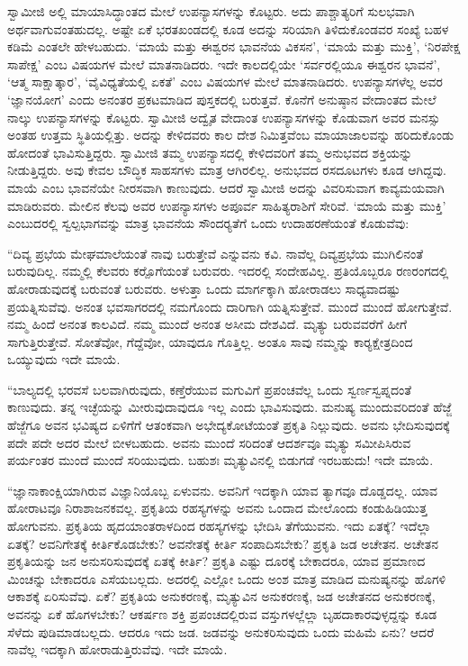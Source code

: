  ಸ್ವಾಮೀಜಿ ಅಲ್ಲಿ ಮಾಯಾಸಿದ್ಧಾಂತದ ಮೇಲೆ ಉಪನ್ಯಾಸಗಳನ್ನು ಕೊಟ್ಟರು. ಅದು ಪಾಶ್ಚಾತ್ಯರಿಗೆ ಸುಲಭವಾಗಿ ಅರ್ಥವಾಗುವಂತಹುದಲ್ಲ. ಅಷ್ಟೇ ಏಕೆ ಭರತಖಂಡದಲ್ಲಿ ಕೂಡ ಅದನ್ನು ಸರಿಯಾಗಿ ತಿಳಿದುಕೊಂಡವರ ಸಂಖ್ಯೆ ಬಹಳ ಕಡಿಮೆ ಎಂತಲೇ ಹೇಳಬಹುದು. ‘ಮಾಯೆ ಮತ್ತು ಈಶ್ವರನ ಭಾವನೆಯ ವಿಕಸನ’, ‘ಮಾಯೆ ಮತ್ತು ಮುಕ್ತಿ’, ‘ನಿರಪೇಕ್ಷ ಸಾಪೇಕ್ಷ’ ಎಂಬ ವಿಷಯಗಳ ಮೇಲೆ ಮಾತನಾಡಿದರು. ಇದೇ ಕಾಲದಲ್ಲಿಯೇ ‘ಸರ್ವರಲ್ಲಿಯೂ ಈಶ್ವರನ ಭಾವನೆ’, ‘ಆತ್ಮ ಸಾಕ್ಷಾತ್ಕಾರ’, ‘ವೈವಿಧ್ಯತೆಯಲ್ಲಿ ಏಕತೆ’ ಎಂಬ ವಿಷಯಗಳ ಮೇಲೆ ಮಾತನಾಡಿದರು. ಉಪನ್ಯಾಸಗಳೆಲ್ಲ ಅವರ ‘ಜ್ಞಾನಯೋಗ’ ಎಂದು ಅನಂತರ ಪ್ರಕಟಮಾಡಿದ ಪುಸ್ತಕದಲ್ಲಿ ಬರುತ್ತವೆ. ಕೊನೆಗೆ ಅನುಷ್ಠಾನ ವೇದಾಂತದ ಮೇಲೆ ನಾಲ್ಕು ಉಪನ್ಯಾಸಗಳನ್ನು ಕೊಟ್ಟರು. ಸ್ವಾಮೀಜಿ ಅದ್ವೈತ ವೇದಾಂತ ಉಪನ್ಯಾಸಗಳನ್ನು ಕೊಡುವಾಗ ಅವರ ಮನಸ್ಸು ಅಂತಹ ಉತ್ತಮ ಸ್ಥಿತಿಯಲ್ಲಿತ್ತು. ಅದನ್ನು ಕೇಳಿದವರು ಕಾಲ ದೇಶ ನಿಮಿತ್ತವೆಂಬ ಮಾಯಾಜಾಲವನ್ನು ಹರಿದುಕೊಂಡು ಹೋದಂತೆ ಭಾವಿಸುತ್ತಿದ್ದರು. ಸ್ವಾಮೀಜಿ ತಮ್ಮ ಉಪನ್ಯಾಸದಲ್ಲಿ ಕೇಳಿದವರಿಗೆ ತಮ್ಮ ಅನುಭವದ ಶಕ್ತಿಯನ್ನು ನೀಡುತ್ತಿದ್ದರು. ಅವು ಕೇವಲ ಬೌದ್ಧಿಕ ಸಾಹಸಗಳು ಮಾತ್ರ ಆಗಿರಲಿಲ್ಲ. ಅನುಭವದ ರಸದೂಟಗಳು ಕೂಡ ಆಗಿದ್ದವು. ಮಾಯೆ ಎಂಬ ಭಾವನೆಯೇ ನೀರಸವಾಗಿ ಕಾಣುವುದು. ಆದರೆ ಸ್ವಾಮೀಜಿ ಅದನ್ನು ವಿವರಿಸುವಾಗ ಕಾವ್ಯಮಯವಾಗಿ ಮಾಡಿರುವರು. ಮೇಲಿನ ಕೆಲವು ಅವರ ಉಪನ್ಯಾಸಗಳು ಅಪೂರ್ವ ಸಾಹಿತ್ಯರಾಶಿಗೆ ಸೇರಿವೆ. ‘ಮಾಯೆ ಮತ್ತು ಮುಕ್ತಿ’ ಎಂಬುದರಲ್ಲಿ ಸ್ವಲ್ಪಭಾಗವನ್ನು ಮಾತ್ರ ಭಾವನೆಯ ಸೌಂದರ‍್ಯತೆಗೆ ಒಂದು ಉದಾಹರಣೆಯಂತೆ ಕೊಡುವೆವು: 

 “ದಿವ್ಯ ಪ್ರಭೆಯ ಮೇಘಮಾಲೆಯಂತೆ ನಾವು ಬರುತ್ತೇವೆ ಎನ್ನುವನು ಕವಿ. ನಾವೆಲ್ಲ ದಿವ್ಯಪ್ರಭೆಯ ಮುಗಿಲಿನಂತೆ ಬರುವುದಿಲ್ಲ. ನಮ್ಮಲ್ಲಿ ಕೆಲವರು ಕರ‍್ಪೊಗೆಯಂತೆ ಬರುವರು. ಇದರಲ್ಲಿ ಸಂದೇಹವಿಲ್ಲ. ಪ್ರತಿಯೊಬ್ಬರೂ ರಣರಂಗದಲ್ಲಿ ಹೋರಾಡುವುದಕ್ಕೆ ಬರುವಂತೆ ಬರುವರು. ಅಳುತ್ತಾ ಒಂದು ಮಾರ್ಗಕ್ಕಾಗಿ ಹೋರಾಡಲು ಸಾಧ್ಯವಾದಷ್ಟು ಪ್ರಯತ್ನಿಸುವೆವು. ಅನಂತ ಭವಸಾಗರದಲ್ಲಿ ನಮಗೊಂದು ದಾರಿಗಾಗಿ ಯತ್ನಿಸುತ್ತೇವೆ. ಮುಂದೆ ಮುಂದೆ ಹೋಗುತ್ತೇವೆ. ನಮ್ಮ ಹಿಂದೆ ಅನಂತ ಕಾಲವಿದೆ. ನಮ್ಮ ಮುಂದೆ ಅನಂತ ಅಸೀಮ ದೇಶವಿದೆ. ಮೃತ್ಯು ಬರುವವರೆಗೆ ಹೀಗೆ ಸಾಗುತ್ತಿರುತ್ತೇವೆ. ಸೋತೆವೋ, ಗೆದ್ದೆವೋ, ಯಾವುದೂ ಗೊತ್ತಿಲ್ಲ. ಅಂತೂ ಸಾವು ನಮ್ಮನ್ನು ಕಾರ‍್ಯಕ್ಷೇತ್ರದಿಂದ ಒಯ್ಯುವುದು ಇದೇ ಮಾಯೆ. 

 “ಬಾಲ್ಯದಲ್ಲಿ ಭರವಸೆ ಬಲವಾಗಿರುವುದು, ಕಣ್ತೆರೆಯುವ ಮಗುವಿಗೆ ಪ್ರಪಂಚವೆಲ್ಲ ಒಂದು ಸ್ವರ್ಣಸ್ವಪ್ನದಂತೆ ಕಾಣುವುದು. ತನ್ನ ಇಚ್ಛೆಯನ್ನು ಮೀರುವುದಾವುದೂ ಇಲ್ಲ ಎಂದು ಭಾವಿಸುವುದು. ಮನುಷ್ಯ ಮುಂದುವರಿದಂತೆ ಹೆಜ್ಜೆ ಹೆಜ್ಜೆಗೂ ಅವನ ಭವಿಷ್ಯದ ಏಳಿಗೆಗೆ ಆತಂಕವಾಗಿ ಅಭೇದ್ಯಕೋಟೆಯಂತೆ ಪ್ರಕೃತಿ ನಿಲ್ಲುವುದು. ಅವನು ಭೇದಿಸುವುದಕ್ಕೆ ಪದೇ ಪದೇ ಅದರ ಮೇಲೆ ಬೀಳಬಹುದು. ಅವನು ಮುಂದೆ ಸರಿದಂತೆ ಆದರ್ಶವೂ ಮೃತ್ಯು ಸಮೀಪಿಸಿರುವ ಪರ್ಯಂತರ ಮುಂದೆ ಮುಂದೆ ಸರಿಯುವುದು. ಬಹುಶಃ ಮೃತ್ಯುವಿನಲ್ಲಿ ಬಿಡುಗಡೆ ಇರಬಹುದು! ಇದೇ ಮಾಯೆ. 

 “ಜ್ಞಾನಾಕಾಂಕ್ಷಿಯಾಗಿರುವ ವಿಜ್ಞಾನಿಯೊಬ್ಬ ಏಳುವನು. ಅವನಿಗೆ ಇದಕ್ಕಾಗಿ ಯಾವ ತ್ಯಾಗವೂ ದೊಡ್ಡದಲ್ಲ. ಯಾವ ಹೋರಾಟವೂ ನಿರಾಶಾಜನಕವಲ್ಲ. ಪ್ರಕೃತಿಯ ರಹಸ್ಯಗಳನ್ನು ಅವನು ಒಂದಾದ ಮೇಲೊಂದು ಕಂಡುಹಿಡಿಯುತ್ತ ಹೋಗುವನು. ಪ್ರಕೃತಿಯ ಹೃದಯಾಂತರಾಳದಿಂದ ರಹಸ್ಯಗಳನ್ನು ಭೇದಿಸಿ ತೆಗೆಯುವನು. ಇದು ಏತಕ್ಕೆ? ಇದೆಲ್ಲಾ ಏತಕ್ಕೆ? ಅವನಿಗೇತಕ್ಕೆ ಕೀರ್ತಿಕೊಡಬೇಕು? ಅವನೇತಕ್ಕೆ ಕೀರ್ತಿ ಸಂಪಾದಿಸಬೇಕು? ಪ್ರಕೃತಿ ಜಡ ಅಚೇತನ. ಅಚೇತನ ಪ್ರಕೃತಿಯನ್ನು ಜನ ಅನುಸರಿಸುವುದಕ್ಕೆ ಏತಕ್ಕೆ ಕೀರ್ತಿ? ಪ್ರಕೃತಿ ಎಷ್ಟು ದೂರಕ್ಕೆ ಬೇಕಾದರೂ, ಯಾವ ಪ್ರಮಾಣದ ಮಿಂಚನ್ನು ಬೇಕಾದರೂ ಎಸೆಯಬಲ್ಲದು. ಅದರಲ್ಲಿ ಎಲ್ಲೋ ಒಂದು ಅಂಶ ಮಾತ್ರ ಮಾಡಿದ ಮನುಷ್ಯನನ್ನು ಹೊಗಳಿ ಆಕಾಶಕ್ಕೆ ಏರಿಸುವೆವು. ಏಕೆ? ಪ್ರಕೃತಿಯ ಅನುಕರಣಕ್ಕೆ, ಮೃತ್ಯುವಿನ ಅನುಕರಣಕ್ಕೆ, ಜಡ ಅಚೇತನದ ಅನುಕರಣಕ್ಕೆ, ಅವನನ್ನು ಏಕೆ ಹೊಗಳಬೇಕು? ಆಕರ್ಷಣ ಶಕ್ತಿ ಪ್ರಪಂಚದಲ್ಲಿರುವ ವಸ್ತುಗಳಲ್ಲೆಲ್ಲಾ ಬೃಹದಾಕಾರವುಳ್ಳದ್ದನ್ನು ಕೂಡ ಸೆಳೆದು ಪುಡಿಮಾಡಬಲ್ಲದು. ಆದರೂ ಇದು ಜಡ. ಜಡವನ್ನು ಅನುಕರಿಸುವುದು ಒಂದು ಮಹಿಮೆ ಏನು? ಆದರೆ ನಾವೆಲ್ಲ ಇದಕ್ಕಾಗಿ ಹೋರಾಡುತ್ತಿರುವೆವು. ಇದೇ ಮಾಯೆ. 

